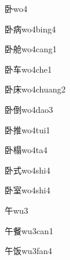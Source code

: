 \begin{verbete}[8]{卧}{wo4}
\end{verbete}

\begin{verbete}[8;10]{卧病}{wo4bing4}
\end{verbete}

\begin{verbete}[8;10]{卧舱}{wo4cang1}
\end{verbete}

\begin{verbete}[8;4]{卧车}{wo4che1}
\end{verbete}

\begin{verbete}[8;7]{卧床}{wo4chuang2}
\end{verbete}

\begin{verbete}[8;10]{卧倒}{wo4dao3}
\end{verbete}

\begin{verbete}[8;11]{卧推}{wo4tui1}
\end{verbete}

\begin{verbete}[8;14]{卧榻}{wo4ta4}
\end{verbete}

\begin{verbete}[8;6]{卧式}{wo4shi4}
\end{verbete}

\begin{verbete}[8;9]{卧室}{wo4shi4}
\end{verbete}

\begin{verbete}[4]{午}{wu3}
\end{verbete}

\begin{verbete}[4;16]{午餐}{wu3can1}
\end{verbete}

\begin{verbete}[4;7]{午饭}{wu3fan4}
\end{verbete}

